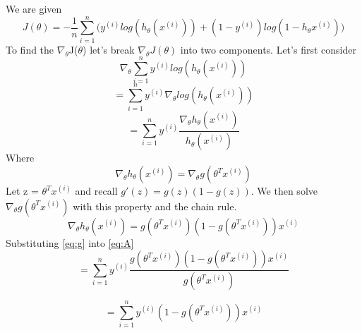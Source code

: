 \begin{answer}
We are given 
\begin{equation} \label{eq:J1}
    J(\theta) = -\frac{1}{n} \sum_{i=1}^{n} \big(
    y^{(i)}log(h_\theta(x^{(i)})) + (1-y^{(i)}) log(1 -h_\theta x^{(i)})
    \big)
\end{equation}
To find the $\nabla_\theta$J($\theta$) let's break $\nabla_\theta J(\theta)$ into two components.
Let's first consider
\begin{equation}
    \nabla_\theta \sum_{i=1}^{n} 
    y^{(i)}log(h_\theta(x^{(i)}))
\end{equation}
\begin{equation}
    =  \sum_{i=1}^{n} 
    y^{(i)} \nabla_\theta log(h_\theta(x^{(i)}))
\end{equation}
\begin{equation} \label{eq:A}
    = \sum_{i=1}^{n} y^{(i)}\frac{\nabla_{\theta}h_{\theta}(x^{(i)})}{h_{\theta}(x^{(i)})}
\end{equation}
Where 
\begin{equation} 
    \nabla_\theta h_{\theta}(x^{(i)}) = \nabla_\theta g(\theta^T x^{(i)})
\end{equation} 
Let z = $\theta^T x^{(i)}$ and recall $g'(z) = g(z)(1-g(z))$. We then solve $\nabla_\theta g(\theta^T x^{(i)})$ with this property and the chain rule.
\begin{equation} \label{eq:g}
    \nabla_\theta h_{\theta}(x^{(i)}) = g(\theta^T x^{(i)})(1-g(\theta^T x^{(i)})) x^{(i)}
\end{equation}
Substituting \ref{eq:g} into \ref{eq:A} 
\begin{equation} 
        = \sum_{i=1}^{n} y^{(i)}
        \frac{g(\theta^T x^{(i)})(1-g(\theta^T x^{(i)})) x^{(i)}}
        {g(\theta^T x^{(i)})}
\end{equation}

\begin{equation}  \label{eq:Adone}
        = \sum_{i=1}^{n} y^{(i)}
        (1-g(\theta^T x^{(i)})) x^{(i)}
\end{equation}


\end{answer}
